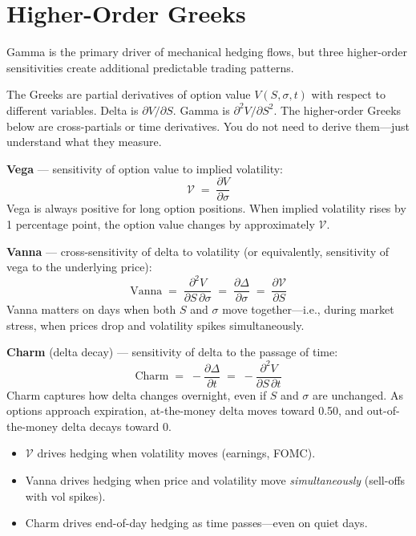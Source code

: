 \section{Higher-Order Greeks}
\label{sec:higher-greeks}

Gamma is the primary driver of mechanical hedging flows, but three
higher-order sensitivities create additional predictable trading
patterns.

\begin{prereq}
The Greeks are partial derivatives of option value $V(S, \sigma, t)$
with respect to different variables.  Delta is $\partial V / \partial S$.
Gamma is $\partial^2 V / \partial S^2$.  The higher-order Greeks below
are cross-partials or time derivatives.  You do not need to derive
them---just understand what they measure.
\end{prereq}

\begin{definition}
\textbf{Vega} --- sensitivity of option value to implied volatility:
\begin{equation}
\label{eq:vega-def}
\mathcal{V} \;=\; \frac{\partial V}{\partial \sigma}
\end{equation}
Vega is always positive for long option positions.  When implied
volatility rises by 1 percentage point, the option value changes by
approximately $\mathcal{V}$.

\textbf{Vanna} --- cross-sensitivity of delta to volatility (or
equivalently, sensitivity of vega to the underlying price):
\begin{equation}
\label{eq:vanna-def}
\text{Vanna} \;=\; \frac{\partial^2 V}{\partial S\, \partial \sigma}
  \;=\; \frac{\partial \Delta}{\partial \sigma}
  \;=\; \frac{\partial \mathcal{V}}{\partial S}
\end{equation}
Vanna matters on days when both $S$ and $\sigma$ move together---i.e.,
during market stress, when prices drop and volatility spikes
simultaneously.

\textbf{Charm} (delta decay) --- sensitivity of delta to the passage
of time:
\begin{equation}
\label{eq:charm-def}
\text{Charm} \;=\; -\frac{\partial \Delta}{\partial t}
  \;=\; -\frac{\partial^2 V}{\partial S\, \partial t}
\end{equation}
Charm captures how delta changes overnight, even if $S$ and $\sigma$
are unchanged.  As options approach expiration, at-the-money delta
moves toward 0.50, and out-of-the-money delta decays toward 0.
\begin{itemize}[nosep]
  \item $\mathcal{V}$ drives hedging when volatility moves
        (earnings, FOMC).
  \item Vanna drives hedging when price and volatility move
        \emph{simultaneously} (sell-offs with vol spikes).
  \item Charm drives end-of-day hedging as time passes---even on
        quiet days.
\end{itemize}
\end{definition}


